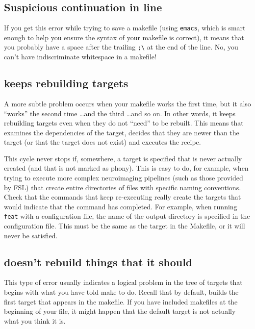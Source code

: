\subsection{Suspicious continuation in line \mypound{}} %

If you get this error while trying to save a makefile (using \texttt{emacs}, which is smart enough to help you ensure the syntax of your makefile is correct), it means that you probably have a space after the trailing \texttt{;\textbackslash} at the end of the line. No, you can't have indiscriminate whitespace in a makefile!

\subsection{\maken{} keeps rebuilding targets}

A more subtle problem occurs when your makefile works the first time, but it also ``works'' the second time \ldots and the third \ldots and so on. In other words, it keeps rebuilding targets even when they do not ``need'' to be rebuilt. This means that \maken{} examines the dependencies of the target, decides that they are newer than the target (or that the target does not exist) and executes the recipe.

This cycle never stops if, somewhere, a target is specified that is never actually created (and that is not marked as phony). This is easy to do, for example, when trying to execute more complex neuroimaging pipelines (such as those provided by FSL) that create entire directories of files with specific naming conventions. Check that the commands that keep re-executing really create the targets that would indicate that the command has completed. For example, when running \texttt{feat} with a configuration file, the name of the output directory is specified in the configuration file. This must be the same as the target in the Makefile, or it will never be satisfied.

\subsection{\maken{} doesn't rebuild things that it should}

This type of error usually indicates a logical problem in the tree of targets that begins with what you have told make to do. Recall that by default, \maken{} builds the first target that appears in the makefile. If you have included makefiles at the beginning of your file, it might happen that the default target is not actually what you think it is.
